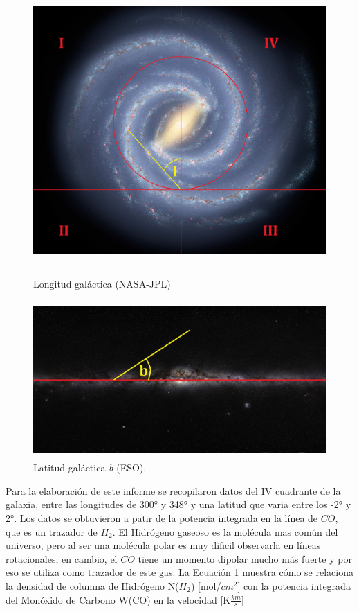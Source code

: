 \documentclass[letterpaper,oneside]{article}
\begin{document}
\begin{figure}
  \centering
  \includegraphics[height=11cm]{../graficos/imagenes/coordenadas_galacticas.png}
  \caption{Longitud galáctica  (NASA-JPL)}
\end{figure}

\begin{figure}
  \centering
  \includegraphics[height=6cm]{../graficos/imagenes/plano_galactico.jpg}
  \caption{Latitud galáctica \emph{b} (ESO).}
\end{figure}

Para la elaboración de este informe se recopilaron datos del \textrm{IV} cuadrante de la galaxia, entre las longitudes de 300° y 348° y una latitud que varia entre los -2° y 2°. Los datos se obtuvieron a patir de la potencia integrada en la línea de $CO$, que es un trazador de $H_2$. El Hidrógeno gaseoso es la molécula mas común del universo, pero al ser una molécula polar es muy dificil observarla en líneas rotacionales, en cambio, el $CO$ tiene un momento dipolar mucho más fuerte y por eso se utiliza como trazador de este gas. La Ecuación 1 muestra cómo se relaciona la densidad de columna de Hidrógeno N($H_2$) [mol/$cm^2$] con la potencia integrada del Monóxido de Carbono W(CO) en la velocidad [K$\frac{km}{s}$]
\end{document}
